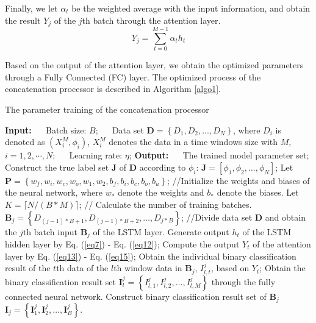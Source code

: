 \documentclass[sn-mathphys]{sn-jnl}%
\theoremstyle{thmstyleone}%
\theoremstyle{thmstyletwo}%
\theoremstyle{thmstylethree}%
\begin{document}
Finally, we let $\alpha_t$ be the weighted average with the input information, and obtain the result $Y_j$ of the $j$th batch through the attention layer.
\begin{equation}
Y_j=\sum_{t=0}^{M-1} \alpha_th_t \label{eq15}
\end{equation}

Based on the output of the attention layer, we obtain the optimized parameters through a Fully Connected (FC) layer. The optimized process of the concatenation processor is described in Algorithm \ref{algo1}.
\begin{algorithm}[htbp]
\caption{The parameter training of the concatenation processor}
\label{algo1}
\begin{algorithmic}[1]
\nolinenumbers
\State \textbf{Input:}
\State $\quad$ Batch size: $B$;
\State $\quad$ Data set $\mathbf{D}=\left\{D_1,D_2,\dots,D_N\right\}$, where $D_i$ is denoted as $\left(X_i^M,\phi_i\right)$, $X_i^M$ denotes the data in a time windows size with $M$, $i=1,2,\cdots,N$;
\State $\quad$ Learning rate: $\eta$;
\State \textbf{Output:}
\State $\quad$ The trained model parameter set;
\linenumbers
\State Construct the true label set $\boldsymbol{\mathbf{J}}$ of $\mathbf{D}$ according to $\phi_i$: $\boldsymbol{\mathbf{J}} =\left[\phi_1,\phi_2,\ldots, \phi_N\right]$;
\State Let $\boldsymbol{\mathbf{P}}=\left\{w_f,w_i,w_c, w_o, w_1, w_2, b_f, b_i, b_c, b_o, b_u\right\}$; //Initialize the weights and biases of the neural network, where $w_*$ denote the weights and $b_*$ denote the biases.
\State Let $K = \lceil N /(B*M) \rceil$; // Calculate the number of training batches.
    \State $\mathbf{B}_j=\left\{D_{(j-1)*B+1},D_{(j-1)*B+2},\dots, D_{j*B}\right\}$;  //Divide data set $\mathbf{D}$ and obtain the $j$th batch input $\mathbf{B}_j$ of the LSTM layer.
          \State Generate output $h_t$ of the LSTM hidden layer by Eq. (\ref{eq7}) - Eq. (\ref{eq12});
          \State Compute the output $Y_t$ of the attention layer by Eq. (\ref{eq13}) - Eq. (\ref{eq15});
          \State Obtain the individual binary classification result of the $t$th data of the $l$th window data in $\mathbf{B}_j$, $I_{l,t}^j$, based on $Y_t$;
       \EndFor
        \State Obtain the binary classification result set $\mathbf{I}_l^j=\left\{I_{l,1}^j,I_{l,2}^j,\dots,I_{l,M}^j\right\}$ through the fully connected neural network.
    \EndFor      
    \State Construct binary classification result set of $\mathbf{B}_j$ $\mathbf{I}_j=\left\{\mathbf{I}_1^j,\mathbf{I}_2^j,\dots,\mathbf{I}_B^j\right\}$.

\end{algorithmic}
\end{algorithm}
\end{document}

